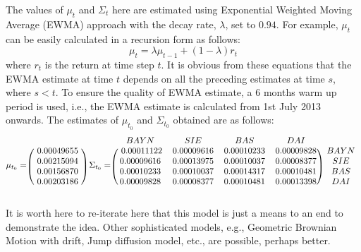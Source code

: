 The values of $\mu_t$ and $\Sigma_t$ here are estimated using Exponential Weighted Moving Average (EWMA) approach with the decay rate, $\lambda$, set to $0.94$. For example, $\mu_t$ can be easily calculated in a recursion form as follows:
\begin{equation}
  \mu_t = \lambda \mu_{t-1} + (1-\lambda) r_{t}
\end{equation}
where $r_t$ is the return at time step $t$. It is obvious from these equations that the EWMA estimate at time $t$ depends on all the preceding estimates at time $s$, where $s < t$. To ensure the quality of EWMA estimate, a 6 months warm up period is used, i.e., the EWMA estimate is calculated from 1st July 2013 onwards. The estimates of $\mu_{t_0}$ and $\Sigma_{t_0}$ obtained are as follows:
\begin{equation}
\mu_{t_0} =
\begin{blockarray}{c}
\\
\begin{block}{(c)}
~ 0.00049655 ~ \\
0.00215094 \\
0.00156870 \\
0.00203186 \\
\end{block}
\end{blockarray}
~\Sigma_{t_0} =
\begin{blockarray}{ccccc}
  BAYN & SIE & BAS & DAI & \\
\begin{block}{(cccc)c}
 ~ 0.00011122 & 0.00009616 & 0.00010233 & 0.00009828 ~ & BAYN \\
0.00009616 & 0.00013975 & 0.00010037 & 0.00008377 ~ & SIE \\
0.00010233 & 0.00010037 & 0.00014317 & 0.00010481 & BAS \\
0.00009828 & 0.00008377 & 0.00010481 & 0.00013398 & DAI \\
\end{block}
\end{blockarray}
\end{equation}
 
It is worth here to re-iterate here that this model is just a means to an end to demonstrate the idea. Other sophisticated models, e.g., Geometric Brownian Motion with drift, Jump diffusion model, etc., are possible, perhaps better.

